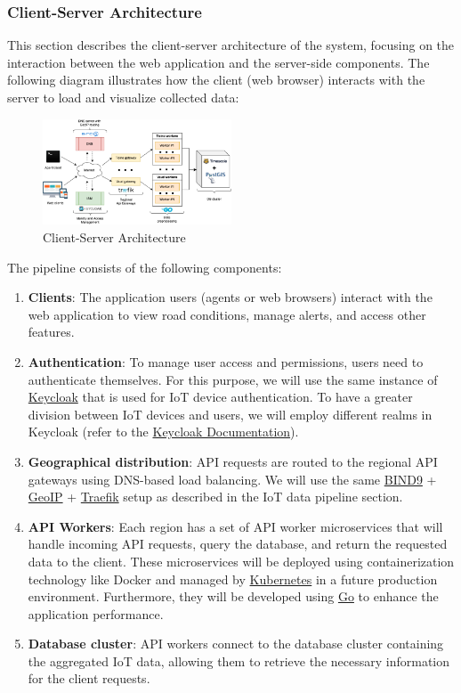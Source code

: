 \subsubsection{Client-Server Architecture}

This section describes the client-server architecture of the system, focusing on the interaction between the web application and the server-side components. The following diagram illustrates how the client (web browser) interacts with the server to load and visualize collected data:

\begin{figure}[h!]
	\centering
	\includegraphics[width=0.5\textwidth]{../../assets/diagrams/web_app_architecture/web_app_architecture.png}
	\caption{Client-Server Architecture}
\end{figure}

The pipeline consists of the following components:

\begin{enumerate}
	\item \textbf{Clients}: The application users (agents or web browsers) interact with the web application to view road conditions, manage alerts, and access other features.
	\item \textbf{Authentication}: To manage user access and permissions, users need to authenticate themselves. For this purpose, we will use the same instance of \href{https://www.keycloak.org/}{Keycloak} that is used for IoT device authentication. To have a greater division between IoT devices and users, we will employ different realms in Keycloak (refer to the \href{https://www.keycloak.org/docs/latest/server_admin/index.html#core-concepts-and-terms}{Keycloak Documentation}).
	\item \textbf{Geographical distribution}: API requests are routed to the regional API gateways using DNS-based load balancing. We will use the same \href{https://www.isc.org/bind/}{BIND9} + \href{https://www.maxmind.com/en/geoip2-databases}{GeoIP} + \href{https://traefik.io/}{Traefik} setup as described in the IoT data pipeline section.
	\item \textbf{API Workers}: Each region has a set of API worker microservices that will handle incoming API requests, query the database, and return the requested data to the client. These microservices will be deployed using containerization technology like Docker and managed by \href{https://kubernetes.io/}{Kubernetes} in a future production environment. Furthermore, they will be developed using \href{https://golang.org/}{Go} to enhance the application performance.
	\item \textbf{Database cluster}: API workers connect to the database cluster containing the aggregated IoT data, allowing them to retrieve the necessary information for the client requests.
\end{enumerate}
